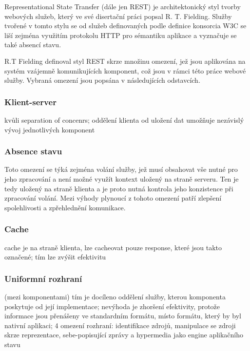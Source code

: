 \documentclass[czech,DP]{thesiskiv}
\begin{document}
%

Representational State Transfer (dále jen REST) je architektonický styl tvorby webových služeb, který ve své disertační práci \cite{fielding2000rest} popsal R. T. Fielding. Služby tvořené v tomto stylu se od služeb definovaných podle definice konsorcia W3C se liší zejména využitím protokolu HTTP pro sémantiku aplikace a vyznačuje se také absencí stavu. 

R.T Fielding definoval styl REST skrze množinu omezení, jež jsou aplikována na systém vzájemně komunikujících komponent, což jsou v rámci této práce webové služby. Vybraná omezení jsou popsána v následujících odstavcích.

\subsubsection{Klient-server}
kvůli separation of concenrs; oddělení klienta od uložení dat umožňuje nezávislý vývoj jednotlivých komponent

\subsubsection{Absence stavu}

Toto omezení se týká zejména volání služby, jež musí obsahovat vše nutné pro jeho zpracování a není možné využít kontext uložený na straně serveru. Ten je tedy uložený na straně klienta a je proto nutná kontrola jeho konzistence při zpracování volání. Mezi výhody plynoucí z tohoto omezení patří zlepšení spolehlivosti a zpřehlednění komunikace.

\subsubsection{Cache}
cache je na straně klienta, lze cacheovat pouze response, které jsou takto označené; tím lze zvýšit efektivitu

\subsubsection{Uniformní rozhraní}
(mezi komponentami)
tím je docíleno oddělení služby, kterou komponenta poskytuje od její implementace; nevýhoda je zhoršení efektivity, protože informace jsou přenášeny ve standardním formátu, místo formátu, který by byl nativní aplikaci; 4 omezení rozhraní: identifikace zdrojů, manipulace se zdroji skrze reprezentace, sebe-popisující zprávy a hypermedia jako engine aplikačního stavu
\end{document}
